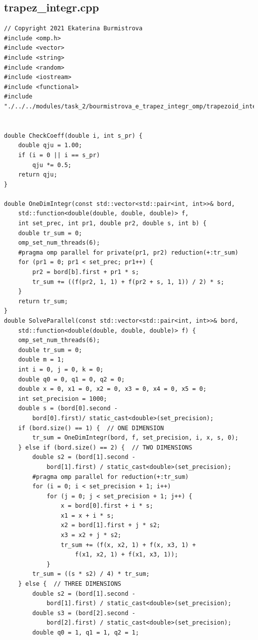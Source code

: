 \documentclass{report}
\begin{document}
  	\subsection*{trapez\_integr.cpp}
 	\begin{verbatim}
// Copyright 2021 Ekaterina Burmistrova
#include <omp.h>
#include <vector>
#include <string>
#include <random>
#include <iostream>
#include <functional>
#include "./../../modules/task_2/bourmistrova_e_trapez_integr_omp/trapezoid_integral_omp.h"


double CheckCoeff(double i, int s_pr) {
    double qju = 1.00;
    if (i = 0 || i == s_pr)
        qju *= 0.5;
    return qju;
}

double OneDimIntegr(const std::vector<std::pair<int, int>>& bord,
    std::function<double(double, double, double)> f,
    int set_prec, int pr1, double pr2, double s, int b) {
    double tr_sum = 0;
    omp_set_num_threads(6);
    #pragma omp parallel for private(pr1, pr2) reduction(+:tr_sum)
    for (pr1 = 0; pr1 < set_prec; pr1++) {
        pr2 = bord[b].first + pr1 * s;
        tr_sum += ((f(pr2, 1, 1) + f(pr2 + s, 1, 1)) / 2) * s;
    }
    return tr_sum;
}
double SolveParallel(const std::vector<std::pair<int, int>>& bord,
    std::function<double(double, double, double)> f) {
    omp_set_num_threads(6);
    double tr_sum = 0;
    double m = 1;
    int i = 0, j = 0, k = 0;
    double q0 = 0, q1 = 0, q2 = 0;
    double x = 0, x1 = 0, x2 = 0, x3 = 0, x4 = 0, x5 = 0;
    int set_precision = 1000;
    double s = (bord[0].second -
        bord[0].first)/ static_cast<double>(set_precision);
    if (bord.size() == 1) {  // ONE DIMENSION
        tr_sum = OneDimIntegr(bord, f, set_precision, i, x, s, 0);
    } else if (bord.size() == 2) {  // TWO DIMENSIONS
        double s2 = (bord[1].second -
            bord[1].first) / static_cast<double>(set_precision);
        #pragma omp parallel for reduction(+:tr_sum)
        for (i = 0; i < set_precision + 1; i++)
            for (j = 0; j < set_precision + 1; j++) {
                x = bord[0].first + i * s;
                x1 = x + i * s;
                x2 = bord[1].first + j * s2;
                x3 = x2 + j * s2;
                tr_sum += (f(x, x2, 1) + f(x, x3, 1) +
                    f(x1, x2, 1) + f(x1, x3, 1));
            }
        tr_sum = ((s * s2) / 4) * tr_sum;
    } else {  // THREE DIMENSIONS
        double s2 = (bord[1].second -
            bord[1].first) / static_cast<double>(set_precision);
        double s3 = (bord[2].second -
            bord[2].first) / static_cast<double>(set_precision);
        double q0 = 1, q1 = 1, q2 = 1;

\end{verbatim}
\end{document}
